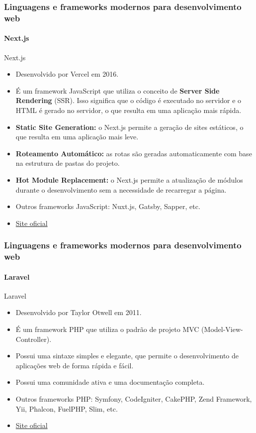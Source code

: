 \documentclass[
	9pt, %
	t, %
]{beamer}
\newcommand{\iconLink}[2]{\href{#1}{\faLink \hspace{0.2em} {#2}}}
\begin{document}
\begin{frame}
	\frametitle{Linguagens e frameworks modernos para desenvolvimento web}
	\framesubtitle{Next.js}

	\begin{block}{Next.js}
		\begin{itemize}
			\item Desenvolvido por Vercel em 2016.
			\item É um framework JavaScript que utiliza o conceito de \textbf{Server Side Rendering} (SSR). Isso significa que o código é executado no servidor e o HTML é gerado no servidor, o que resulta em uma aplicação mais rápida.
			\item \textbf{Static Site Generation:} o Next.js permite a geração de sites estáticos, o que resulta em uma aplicação mais leve.
			\item \textbf{Roteamento Automático:} as rotas são geradas automaticamente com base na estrutura de pastas do projeto.
			\item \textbf{Hot Module Replacement:} o Next.js permite a atualização de módulos durante o desenvolvimento sem a necessidade de recarregar a página.
			\item Outros frameworks JavaScript: Nuxt.js, Gatsby, Sapper, etc.
			\item \iconLink{https://nextjs.org/}{Site oficial}
		\end{itemize}

	\end{block}

\end{frame}

\begin{frame}
	\frametitle{Linguagens e frameworks modernos para desenvolvimento web}
	\framesubtitle{Laravel}

	\begin{block}{Laravel}
		\begin{itemize}
			\item Desenvolvido por Taylor Otwell em 2011. 
			\item É um framework PHP que utiliza o padrão de projeto MVC (Model-View-Controller).
			\item Possui uma sintaxe simples e elegante, que permite o desenvolvimento de aplicações web de forma rápida e fácil.
			\item Possui uma comunidade ativa e uma documentação completa.
			\item Outros frameworks PHP: Symfony, CodeIgniter, CakePHP, Zend Framework, Yii, Phalcon, FuelPHP, Slim, etc.
			\item \iconLink{https://laravel.com/}{Site oficial}
		\end{itemize}
	\end{block}

\end{frame}
\end{document}
